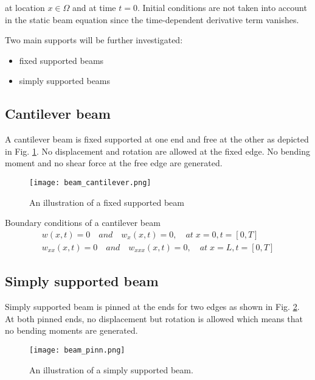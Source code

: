 \noindent at location $x \in \Omega$ and at time $t=0$. Initial conditions are not taken 
into account in the static beam equation since the time-dependent derivative term vanishes. 

\vspace{5mm}
\noindent Two main supports will be further investigated:
\begin{itemize}
    \item fixed supported beams
    \item simply supported beams
\end{itemize}

\subsection{Cantilever beam}

A cantilever beam is fixed supported at one end and free at the other as depicted in Fig. \ref{fig:beam_cantilever}. 
No displacement and rotation are allowed at the fixed edge. No bending moment and no shear force at the free edge
are generated. 

\begin{figure}[!ht]
    \centering
    \texttt{[image: beam\_cantilever.png]}  
    \caption{An illustration of a fixed supported beam}
    \label{fig:beam_cantilever}
\end{figure}

Boundary conditions of a cantilever beam
\begin{equation}
    \begin{array}{l}
    w(x,t)=0 \quad and \quad w_{x}(x,t)=0, \quad at \; x=0, t=[0,T] \\
    w_{xx}(x,t)=0 \quad and \quad w_{xxx}(x,t)=0, \quad at \; x=L, t=[0,T]
    \end{array}
\end{equation}

\subsection{Simply supported beam}
Simply supported beam is pinned at the ends for two edges as shown in Fig. \ref{fig:beam_pinn}. At both pinned ends, 
no displacement but rotation 
is allowed which means that no bending moments are generated.

\vspace{5mm}

\begin{figure}[!ht]
    \centering
    \texttt{[image: beam\_pinn.png]}  
    \caption{An illustration of a simply supported beam.}
    \label{fig:beam_pinn}
\end{figure}

